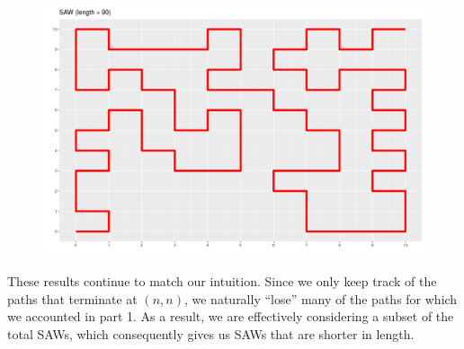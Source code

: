 \documentclass[journal, a4paper]{IEEEtran}
\begin{document}
	\begin{figure}[h]
	\begin{center}
		\includegraphics[width = 0.9\columnwidth]{nn_SAW_90}
	\end{center}
	\end{figure}
	
	
	\newpage	
	
	These results continue to match our intuition. Since we only keep track of the paths that terminate at $(n,n)$, we naturally ``lose'' many of the paths for which we
	accounted in part 1. As a result, we are effectively considering a subset of the total SAWs, which consequently gives us SAWs that are shorter in length.
	
	
	

\end{document}
